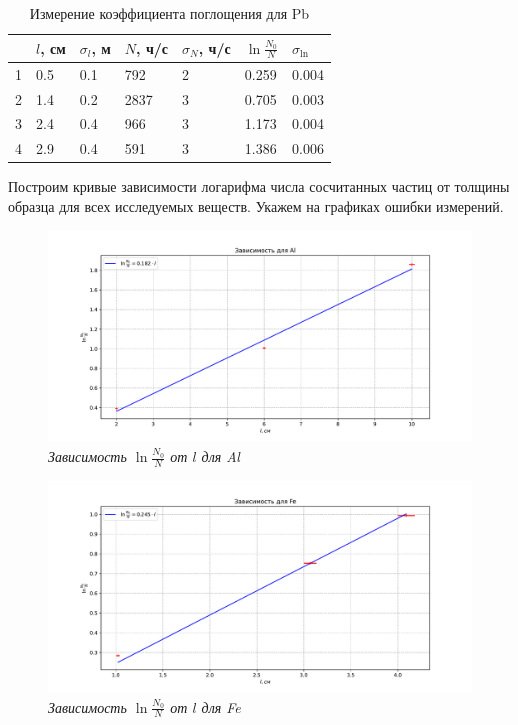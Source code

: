 \documentclass[a4paper,12pt]{article}
\begin{document}
\begin{table}[!ht]
    \centering
    \begin{tabular}{|l|l|l|l|l|l|l|}
        \hline
          & $l$, см    & $\sigma_l$, м & $N$, ч/с & $\sigma_N$, ч/с & $\ln \frac{N_0}{N}$  & $\sigma_\text{ln}$ \\ \hline
        1 & 0.5 & 0.1      & 792  & 2    & 0.259 & 0.004      \\ \hline
        2 & 1.4 & 0.2      & 2837  & 3     & 0.705 & 0.003      \\ \hline
        3 & 2.4 & 0.4      & 966   & 3     & 1.173 & 0.004      \\ \hline
        4 & 2.9 & 0.4      & 591   & 3     & 1.386 & 0.006      \\ \hline
    \end{tabular}
    \caption{Измерение коэффициента поглощения для Pb}
    \label{table:7}
\end{table}
\FloatBarrier



Построим кривые зависимости логарифма числа сосчитанных частиц от толщины образца для всех исследуемых веществ. Укажем на графиках ошибки измерений.


\FloatBarrier
\begin{figure}[!ht]
        \centering
	\includegraphics[width=1.0\textwidth]{pictures/graph_Al.pdf}
	\caption{\textit{Зависимость $\ln \frac{N_0}{N}$ от $l$ для Al}}
	\label{graph:1}
\end{figure}

\begin{figure}[!ht]
        \centering
	\includegraphics[width=1.0\textwidth]{pictures/graph_Fe.pdf}
	\caption{\textit{Зависимость $\ln \frac{N_0}{N}$ от $l$ для Fe}}
	\label{graph:2}
\end{figure}
\end{document}
